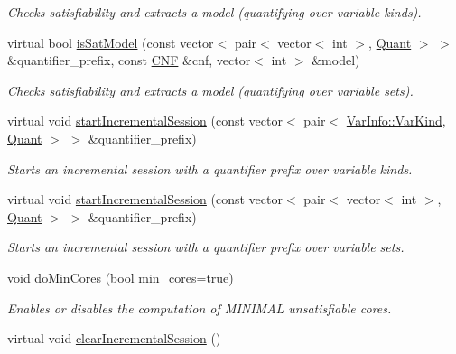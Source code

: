 \begin{DoxyCompactItemize}
\begin{DoxyCompactList}\small\item\em Checks satisfiability and extracts a model (quantifying over variable kinds). \end{DoxyCompactList}\item 
virtual bool \hyperlink{classDepQBFApi_a4278bfb0cf01f21e9aa6333e14e4f5af}{is\-Sat\-Model} (const vector$<$ pair$<$ vector$<$ int $>$, \hyperlink{classQBFSolver_ac091e263cb55286cc07b2451bcf4d3c7}{Quant} $>$ $>$ \&quantifier\-\_\-prefix, const \hyperlink{classCNF}{C\-N\-F} \&cnf, vector$<$ int $>$ \&model)
\begin{DoxyCompactList}\small\item\em Checks satisfiability and extracts a model (quantifying over variable sets). \end{DoxyCompactList}\item 
virtual void \hyperlink{classDepQBFApi_a35fa14f374a196a2270baa1945e33050}{start\-Incremental\-Session} (const vector$<$ pair$<$ \hyperlink{classVarInfo_a64d1da76cf84fe674e5fef9764ef11cf}{Var\-Info\-::\-Var\-Kind}, \hyperlink{classQBFSolver_ac091e263cb55286cc07b2451bcf4d3c7}{Quant} $>$ $>$ \&quantifier\-\_\-prefix)
\begin{DoxyCompactList}\small\item\em Starts an incremental session with a quantifier prefix over variable kinds. \end{DoxyCompactList}\item 
virtual void \hyperlink{classDepQBFApi_add8abd2d970c037034012ebc21982c7e}{start\-Incremental\-Session} (const vector$<$ pair$<$ vector$<$ int $>$, \hyperlink{classQBFSolver_ac091e263cb55286cc07b2451bcf4d3c7}{Quant} $>$ $>$ \&quantifier\-\_\-prefix)
\begin{DoxyCompactList}\small\item\em Starts an incremental session with a quantifier prefix over variable sets. \end{DoxyCompactList}\item 
void \hyperlink{classDepQBFApi_a27bd21f37d83710250f9efeaeb9ad339}{do\-Min\-Cores} (bool min\-\_\-cores=true)
\begin{DoxyCompactList}\small\item\em Enables or disables the computation of M\-I\-N\-I\-M\-A\-L unsatisfiable cores. \end{DoxyCompactList}\item 
virtual void \hyperlink{classDepQBFApi_a4cacfbb0e933d8a66bd24ce5b71ea623}{clear\-Incremental\-Session} ()

\end{DoxyCompactItemize}
